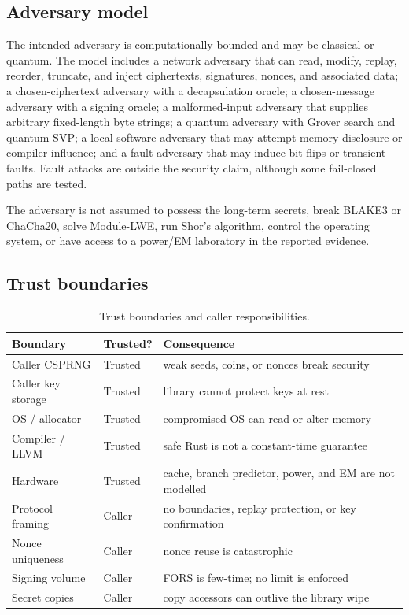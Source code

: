\documentclass[runningheads]{llncs}
\begin{document}
\subsection{Adversary model}

The intended adversary is computationally bounded and may be classical
or quantum.  The model includes a network adversary that can read,
modify, replay, reorder, truncate, and inject ciphertexts, signatures,
nonces, and associated data; a chosen-ciphertext adversary with a
decapsulation oracle; a chosen-message adversary with a signing oracle;
a malformed-input adversary that supplies arbitrary fixed-length byte
strings; a quantum adversary with Grover search and quantum SVP; a local
software adversary that may attempt memory disclosure or compiler
influence; and a fault adversary that may induce bit flips or transient
faults.  Fault attacks are outside the security claim, although some
fail-closed paths are tested.

The adversary is not assumed to possess the long-term secrets, break
BLAKE3 or ChaCha20, solve Module-LWE, run Shor's algorithm, control the
operating system, or have access to a power/EM laboratory in the
reported evidence.

\subsection{Trust boundaries}

\begin{table}[t]
\centering
\small
\begin{tabular}{@{}p{3.1cm}p{1.5cm}p{7.0cm}@{}}
\toprule
Boundary & Trusted? & Consequence \\
\midrule
Caller CSPRNG & Trusted & weak seeds, coins, or nonces break security \\
Caller key storage & Trusted & library cannot protect keys at rest \\
OS / allocator & Trusted & compromised OS can read or alter memory \\
Compiler / LLVM & Trusted & safe Rust is not a constant-time guarantee \\
Hardware & Trusted & cache, branch predictor, power, and EM are not modelled \\
Protocol framing & Caller & no boundaries, replay protection, or key confirmation \\
Nonce uniqueness & Caller & nonce reuse is catastrophic \\
Signing volume & Caller & FORS is few-time; no limit is enforced \\
Secret copies & Caller & copy accessors can outlive the library wipe \\
\bottomrule
\end{tabular}
\caption{Trust boundaries and caller responsibilities.}
\label{tab:trust}
\end{table}
\end{document}
